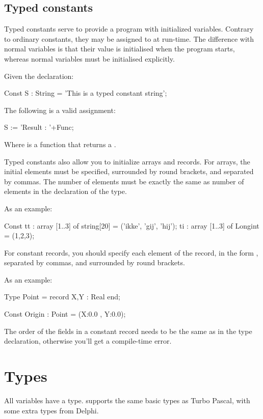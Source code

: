 \documentclass{report}
\begin{document}
\section{Typed constants}
Typed constants serve to provide a program with initialized variables.
Contrary to ordinary constants, they may be assigned to at run-time.
The difference with normal variables is that their value is initialised
when the program starts, whereas normal variables must be initialised
explicitly.



Given the declaration:
\begin{listing}
Const
  S : String = 'This is a typed constant string';
\end{listing}
The following is a valid assignment:
\begin{listing}
 S := 'Result : '+Func;
\end{listing}
Where  is a function that returns a .

Typed constants also allow you to initialize arrays and records. For arrays,
the initial elements must be specified, surrounded by round brackets, and
separated by commas. The number of elements must be exactly the same as
number of elements in the declaration of the type. 

As an example:
\begin{listing}
Const 
  tt : array [1..3] of string[20] = ('ikke', 'gij', 'hij');
  ti : array [1..3] of Longint = (1,2,3);
\end{listing}

For constant records, you should specify each element of the record, in the
form , separated by commas, and surrounded by round
brackets.

As an example:
\begin{listing}
Type 
  Point = record
    X,Y : Real
    end;

Const
  Origin : Point = (X:0.0 , Y:0.0); 
\end{listing}
The order of the fields in a constant record needs to be the same as in the type declaration,
otherwise you'll get a compile-time error.

\chapter{Types}

All variables have a type. \fpc supports the same basic types as Turbo
Pascal, with some extra types from Delphi.
\end{document}
